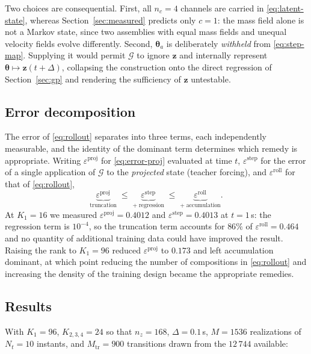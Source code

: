 \documentclass[11pt]{article}
\newcommand{\bs}[1]{\boldsymbol{#1}}
\begin{document}
Two choices are consequential. First, all $n_c = 4$ channels are carried in \eqref{eq:latent-state},
whereas Section~\ref{sec:measured} predicts only $c=1$: the mass field alone is not a Markov state,
since two assemblies with equal mass fields and unequal velocity fields evolve differently. Second,
$\bs{\theta}_a$ is deliberately \emph{withheld} from \eqref{eq:step-map}. Supplying it would permit
$\mathcal{G}$ to ignore $\bs{z}$ and internally represent $\bs{\theta} \mapsto \bs{z}(t+\Delta)$,
collapsing the construction onto the direct regression of Section~\ref{sec:gp} and rendering the
sufficiency of $\bs{z}$ untestable.

\subsection{Error decomposition}

The error of \eqref{eq:rollout} separates into three terms, each independently measurable, and the
identity of the dominant term determines which remedy is appropriate. Writing
$\varepsilon^{\text{proj}}$ for \eqref{eq:error-proj} evaluated at time $t$,
$\varepsilon^{\text{step}}$ for the error of a single application of $\mathcal{G}$ to the
\emph{projected} state (teacher forcing), and $\varepsilon^{\text{roll}}$ for that of
\eqref{eq:rollout},
\begin{equation}
  \underbrace{\varepsilon^{\text{proj}}}_{\text{truncation}}
  \; \leq \;
  \underbrace{\varepsilon^{\text{step}}}_{+\;\text{regression}}
  \; \leq \;
  \underbrace{\varepsilon^{\text{roll}}}_{+\;\text{accumulation}} .
  \label{eq:three-terms}
\end{equation}
At $K_1 = 16$ we measured $\varepsilon^{\text{proj}} = 0.4012$ and
$\varepsilon^{\text{step}} = 0.4013$ at $t = 1$\,s: the regression term is $10^{-4}$, so the
truncation term accounts for $86\%$ of $\varepsilon^{\text{roll}} = 0.464$ and no quantity of
additional training data could have improved the result. Raising the rank to $K_1 = 96$ reduced
$\varepsilon^{\text{proj}}$ to $0.173$ and left accumulation dominant, at which point reducing the
number of compositions in \eqref{eq:rollout} and increasing the density of the training design became
the appropriate remedies.

\subsection{Results}

With $K_1 = 96$, $K_{2,3,4} = 24$ so that $n_z = 168$, $\Delta = 0.1$\,s, $M = 1536$ realizations of
$N_t = 10$ instants, and $M_{\mathrm{tr}} = 900$ transitions drawn from the $12\,744$ available:
\end{document}
